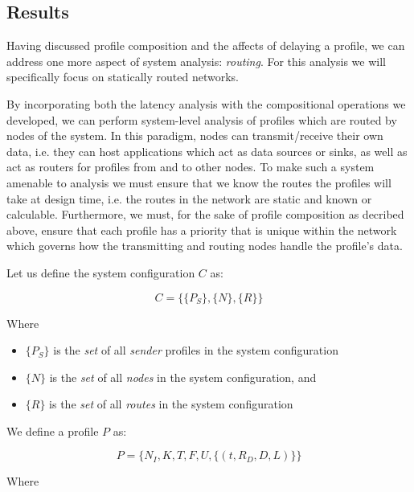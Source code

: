 \subsection{Results}
Having discussed profile composition and the affects of delaying a
profile, we can address one more aspect of system analysis:
\emph{routing}.  For this analysis we will specifically focus on
statically routed networks.

By incorporating both the latency analysis with the compositional
operations we developed, we can perform system-level analysis of profiles
which are routed by nodes of the system.  In this paradigm, nodes can
transmit/receive their own data, i.e. they can host applications which
act as data sources or sinks, as well as act as routers for profiles from
and to other nodes.  To make such a system amenable to analysis we
must ensure that we know the routes the profiles will take at design
time, i.e. the routes in the network are static and known or
calculable.  Furthermore, we must, for the sake of profile composition as
decribed above, ensure that each profile has a priority that is unique
within the network which governs how the transmitting and routing
nodes handle the profile's data.

Let us define the system configuration $C$ as:

\begin{equation}
  C = \{\{P_S\},\{N\},\{R\}\}
\end{equation}

Where

\begin{itemize}
\item $\{P_S\}$ is the \emph{set} of all \emph{sender} profiles in the system
  configuration
\item $\{N\}$ is the \emph{set} of all \emph{nodes} in the system configuration, and
\item $\{R\}$ is the \emph{set} of all \emph{routes} in the system configuration
\end{itemize}

We define a profile $P$ as:

\begin{equation}
  P = \{N_I,K,T,F,U,\{(t,R_D,D,L)\}\}
\end{equation}

Where


